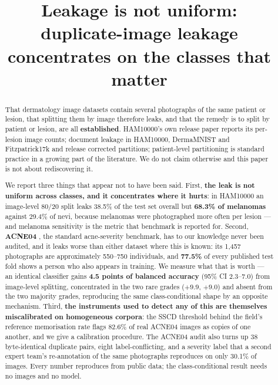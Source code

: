 \documentclass[11pt]{article}
\title{Leakage is not uniform:\\
duplicate-image leakage concentrates on the classes that matter}
\author{}
\date{}
\begin{document}
\maketitle

\begin{abstract}
That dermatology image datasets contain several photographs of the same patient or lesion,
that splitting them by image therefore leaks, and that the remedy is to split by patient or
lesion, are all \textbf{established}. HAM10000's own release paper reports its per-lesion
image counts; \citet{fitzpatrick_audit2024} document leakage in HAM10000, DermaMNIST and
Fitzpatrick17k and release corrected partitions; patient-level partitioning is standard
practice in a growing part of the literature. We do not claim otherwise and this paper is
not about rediscovering it.

We report three things that appear not to have been said. First, \textbf{the leak is not
uniform across classes, and it concentrates where it hurts}: in HAM10000 an image-level
80/20 split leaks 38.5\% of the test set overall but \textbf{68.3\% of melanomas} against
29.4\% of nevi, because melanomas were photographed more often per lesion --- and melanoma
sensitivity is the metric that benchmark is reported for. Second, \textbf{ACNE04}
\citep{wu2019}, the standard acne-severity benchmark, has to our knowledge never been
audited, and it leaks worse than either dataset where this is known: its 1{,}457
photographs are approximately 550--750 individuals, and \textbf{77.5\%} of every published
test fold shows a person who also appears in training. We measure what that is worth ---
an identical classifier gains \textbf{4.5 points of balanced accuracy} (95\% CI 2.3--7.0)
from image-level splitting, concentrated in the two rare grades ($+9.9$, $+9.0$) and absent
from the two majority grades, reproducing the same class-conditional shape by an opposite
mechanism. Third, \textbf{the instruments used to detect any of this are themselves
miscalibrated on homogeneous corpora}: the SSCD threshold behind the field's reference
memorisation rate flags 82.6\% of real ACNE04 images as copies of one another, and we give a
calibration procedure. The ACNE04 audit also turns up 38 byte-identical duplicate pairs,
eight label-conflicting, and a severity label that a second expert team's re-annotation of
the same photographs reproduces on only 30.1\% of images. Every number reproduces from
public data; the class-conditional result needs no images and no model.
\end{abstract}
\end{document}
